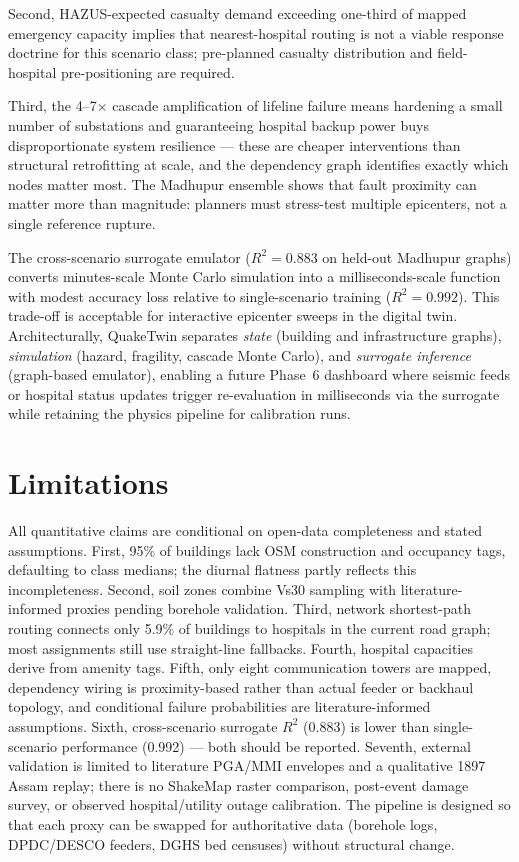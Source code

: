 \documentclass[a4paper,fleqn]{cas-sc}
\begin{document}
Second, HAZUS-expected casualty demand exceeding one-third of mapped
emergency capacity implies that nearest-hospital routing is not a viable
response doctrine for this scenario class; pre-planned casualty distribution
and field-hospital pre-positioning are required.

Third, the 4--7$\times$ cascade amplification of lifeline failure means
hardening a small number of substations and guaranteeing hospital backup
power buys disproportionate system resilience --- these are cheaper
interventions than structural retrofitting at scale, and the dependency
graph identifies exactly which nodes matter most. The Madhupur ensemble
shows that fault proximity can matter more than magnitude: planners must
stress-test multiple epicenters, not a single reference rupture.

The cross-scenario surrogate emulator ($R^2 = 0.883$ on held-out Madhupur graphs) converts
minutes-scale Monte Carlo simulation into a milliseconds-scale function with modest
accuracy loss relative to single-scenario training ($R^2 = 0.992$). This
trade-off is acceptable for interactive epicenter sweeps in the digital twin.
Architecturally, QuakeTwin separates \textit{state} (building and infrastructure
graphs), \textit{simulation} (hazard, fragility, cascade Monte Carlo), and
\textit{surrogate inference} (graph-based emulator), enabling a future Phase~6 dashboard where
seismic feeds or hospital status updates trigger re-evaluation in milliseconds
via the surrogate while retaining the physics pipeline for calibration runs.

\section{Limitations}
\label{sec:limitations}
All quantitative claims are conditional on open-data completeness and stated
assumptions. First, 95\% of buildings lack OSM construction and occupancy
tags, defaulting to class medians; the diurnal flatness partly reflects this
incompleteness. Second, soil zones combine Vs30 sampling with
literature-informed proxies pending borehole validation. Third, network
shortest-path routing connects only 5.9\% of buildings to hospitals in the
current road graph; most assignments still use straight-line fallbacks.
Fourth, hospital capacities derive from amenity tags. Fifth, only eight
communication towers are mapped, dependency wiring is proximity-based rather
than actual feeder or backhaul topology, and conditional failure
probabilities are literature-informed assumptions. Sixth, cross-scenario surrogate
$R^2$ (0.883) is lower than single-scenario performance (0.992) --- both
should be reported. Seventh, external validation is limited to literature
PGA/MMI envelopes and a qualitative 1897 Assam replay; there is no ShakeMap
raster comparison, post-event damage survey, or observed hospital/utility
outage calibration. The pipeline is designed so that each proxy can be
swapped for authoritative data (borehole logs, DPDC/DESCO feeders, DGHS bed
censuses) without structural change.
\end{document}
